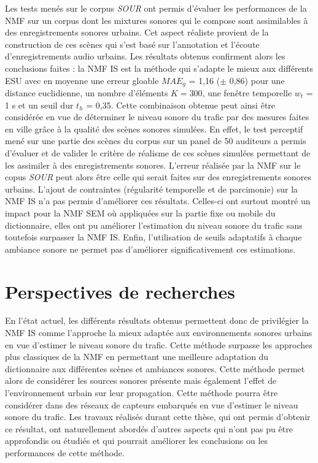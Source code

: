 Les tests menés sur le corpus \textit{SOUR} ont permis d'évaluer les performances de la NMF sur un corpus dont les mixtures sonores qui le compose sont assimilables à des enregistrements sonores urbains. Cet aspect \og réaliste \fg{} provient de la construction de ces scènes qui s'est basé sur l'annotation et l'écoute d'enregistrements audio urbains. Les résultats obtenus confirment alors les conclusions faites : la NMF IS est la méthode qui s'adapte le mieux aux différents ESU avec en moyenne une erreur gloable $MAE_g$ = 1,16 ($\pm$ 0,86) pour une distance euclidienne, un nombre d'éléments $K = 300$, une fenêtre temporelle $w_t$ = 1 s et un seuil dur $t_h$ = 0,35. Cette combinaison obtenue peut ainsi être considérée en vue de déterminer le niveau sonore du trafic par des mesures faites en ville grâce à la qualité des scènes sonores simulées. En effet, le test perceptif mené sur une partie des scènes du corpus sur un panel de 50 auditeurs a permis d'évaluer et de valider le critère de \og réalisme \fg{} de ces scènes simulées permettant de les assimiler à des enregistrements sonores. L'erreur réalisée par la NMF sur le copus \textit{SOUR} peut alors être celle qui serait faites sur des enregistrements sonores urbains.
L'ajout de contraintes (régularité temporelle et de parcimonie) sur la NMF IS n'a pas permis d'améliorer ces résultats. Celles-ci ont surtout montré un impact pour la NMF SEM où appliquées sur la partie fixe ou mobile du dictionnaire, elles ont pu améliorer l'estimation du niveau sonore du trafic sans toutefois surpasser la NMF IS. Enfin, l'utilisation de seuils adaptatifs à chaque ambiance sonore ne permet pas d'améliorer significativement ces estimations.


\section*{Perspectives de recherches}

En l'état actuel, les différents résultats obtenus permettent donc de privilégier la NMF IS comme l'approche la mieux adaptée aux environnements sonores urbains en vue d'estimer le niveau sonore du trafic. Cette méthode surpasse les approches plus classiques de la NMF en permettant une meilleure adaptation du dictionnaire aux différentes scènes et ambiances sonores. Cette méthode permet alors de considérer les sources sonores présente mais également l'effet de l'environnement urbain sur leur propagation. Cette méthode pourra être considérer dans des réseaux de capteurs embarqués en vue d'estimer le niveau sonore du trafic.
Les travaux réalisés durant cette thèse, qui ont permis d'obtenir ce résultat, ont naturellement abordés d'autres aspects qui n'ont pas pu être approfondis ou étudiés et qui pourrait améliorer les conclusions ou les performances de cette méthode.

